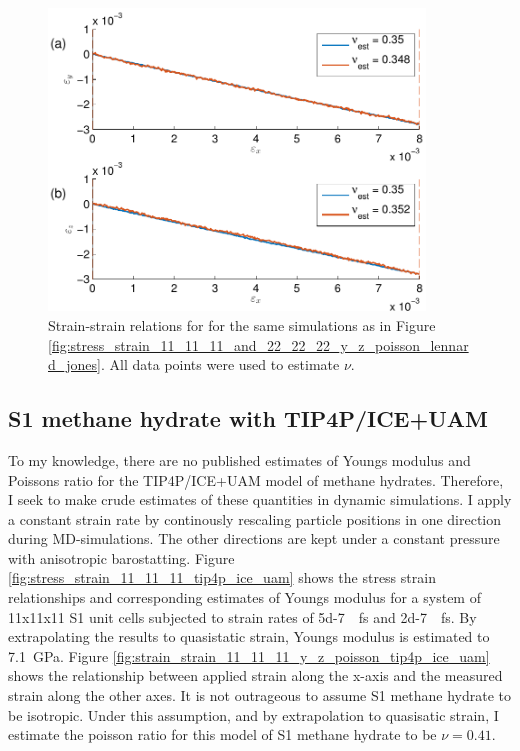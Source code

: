 \begin{figure}
\centering
\includegraphics[width=10cm]{../figures/thesis/strain_strain_11_11_11_and_22_22_22_y_z_poisson_lennard_jones.pdf}
\caption{Strain-strain relations for for the same simulations as in Figure \ref{fig:stress_strain_11_11_11_and_22_22_22_y_z_poisson_lennard_jones}. All data points were used to estimate $\nu$.}
\label{fig:strain_strain_11_11_11_and_22_22_22_y_z_poisson_lennard_jones}
\end{figure}

\subsection{S1 methane hydrate with TIP4P/ICE+UAM}
To my knowledge, there are no published estimates of Youngs modulus and Poissons ratio for the TIP4P/ICE+UAM model of methane hydrates. Therefore, I seek to make crude estimates of these quantities in dynamic simulations. I apply a constant strain rate by continously rescaling particle positions in one direction during MD-simulations. The other directions are kept under a constant pressure with anisotropic barostatting.
Figure \ref{fig:stress_strain_11_11_11_tip4p_ice_uam} shows the stress strain relationships and corresponding estimates of Youngs modulus for a system of 11x11x11 S1 unit cells subjected to strain rates of \SI{5d-7}{\per\femto\second} and \SI{2d-7}{\per\femto\second}. By extrapolating the results to quasistatic strain, Youngs modulus is estimated to \SI{7.1}{\giga\pascal}. 
Figure \ref{fig:strain_strain_11_11_11_y_z_poisson_tip4p_ice_uam} shows the relationship between applied strain along the x-axis and the measured strain along the other axes. It is not outrageous to assume S1 methane hydrate to be isotropic. Under this assumption, and by extrapolation to quasisatic strain, I estimate the poisson ratio for this model of S1 methane hydrate to be $\nu = 0.41$. 

